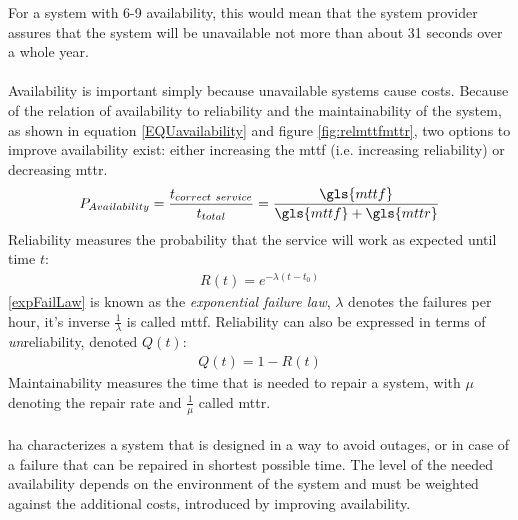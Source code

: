 For a system with 6-9 availability, this would mean that the system provider assures that the system will be unavailable not more than about 31 seconds over a
whole year.
\\
\\
Availability is important simply because unavailable systems cause costs. Because of the relation of availability to reliability and the maintainability
of the system, as shown in equation \ref{EQUavailability} and figure \ref{fig:relmttfmttr}, two options to improve availability exist: either increasing
the \gls{mttf} (i.e. increasing reliability) or decreasing \gls{mttr}.
\begin{align}\label{EQUavailability}
 P_{Availability} = \frac{t_{correct\ service}}{t_{total}} =  \frac{{\gls{mttf}}}{\gls{mttf}+\gls{mttr}}
\end{align}
Reliability measures the probability that the service will work as expected until time $t$:
\begin{align}\label{expFailLaw}
 R(t) = e^{-\lambda(t-t_0)}
\end{align}
\ref{expFailLaw} is known as the \textit{exponential failure law}, $\lambda$ denotes the failures per hour, it's inverse $\frac{1}{\lambda}$ is
called \gls{mttf}. Reliability can also be expressed in terms of \textit{un}reliability, denoted $Q(t)$:
\begin{align}
 Q(t) = 1 - R(t)
\end{align}
Maintainability measures the time that is needed to repair a system, with $\mu$ denoting the repair rate and $\frac{1}{\mu}$ called \gls{mttr}.
\\
\\
\gls{ha} characterizes a system that is designed in a way to avoid outages, or in case of a failure that can be repaired in shortest possible time. 
The level of the needed availability depends on the environment of the system and must be weighted against the additional costs, introduced by improving availability.

